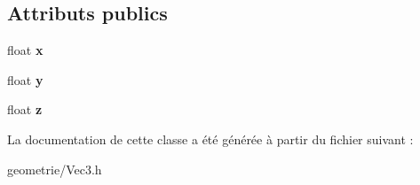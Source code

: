 \subsection*{Attributs publics}
\begin{DoxyCompactItemize}
\item 
\hypertarget{class_vec3_a2814580e9b9372738c0a61197ea46b51}{float {\bfseries x}}\label{class_vec3_a2814580e9b9372738c0a61197ea46b51}

\item 
\hypertarget{class_vec3_abc1d241232cb04aa98217a942402ae68}{float {\bfseries y}}\label{class_vec3_abc1d241232cb04aa98217a942402ae68}

\item 
\hypertarget{class_vec3_a64f3f00cd2dd9076999eeb2f05210388}{float {\bfseries z}}\label{class_vec3_a64f3f00cd2dd9076999eeb2f05210388}

\end{DoxyCompactItemize}


La documentation de cette classe a été générée à partir du fichier suivant \-:\begin{DoxyCompactItemize}
\item 
geometrie/Vec3.\-h\end{DoxyCompactItemize}
